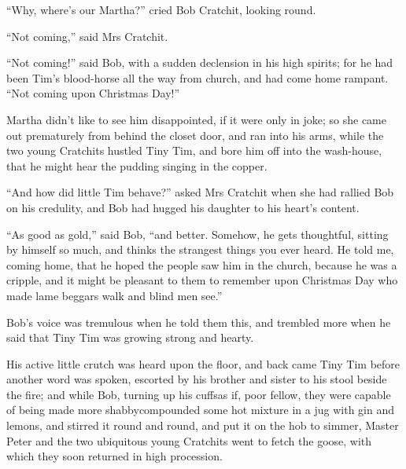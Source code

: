\documentclass[paper=5.5in:8.5in,BCOR=7mm,twoside,DIV=calc,12pt,usegeometry]{scrbook} %
\begin{document}
\enquote{Why, where's our Martha?} cried Bob Cratchit, looking round.

\enquote{Not coming,} said Mrs Cratchit.

\afterpage{\clearpage}

\enquote{Not coming!} said Bob, with a sudden declension in his high spirits; for he had been Tim's blood-horse all the way from church, and had come home rampant. \enquote{Not coming upon Christmas Day!}

Martha didn't like to see him disappointed, if it were only in joke; so she came out prematurely from behind the closet door, and ran into his arms, while the two young Cratchits hustled Tiny Tim, and bore him off into the wash-house, that he might hear the pudding singing in the copper.

\enquote{And how did little Tim behave?} asked Mrs Cratchit when she had rallied Bob on his credulity, and Bob had hugged his daughter to his heart's content.


\enquote{As good as gold,} said Bob, \enquote{and better. Somehow, he gets \newline thoughtful, sitting by himself so much, and thinks the strangest things you ever heard. He told me, coming home, that he hoped the people saw him in the church, because he was a cripple, and it might be pleasant to them to remember upon Christmas Day who made lame beggars walk and blind men see.}



Bob's voice was tremulous when he told them this, and trembled more when he said that Tiny Tim was growing strong and hearty.

His active little crutch was heard upon the floor, and back came Tiny Tim before another word was spoken, escorted by his brother and sister to his stool beside the fire; and while Bob, turning up his cuffs\textemdash as if, poor fellow, they were capable of being made more shabby\textemdash compounded some hot mixture in a jug with gin and lemons, and stirred it round and round, and put it on the hob to simmer, Master Peter and the two ubiquitous young Cratchits went to fetch the goose, with which they soon returned in high procession.
\end{document}
